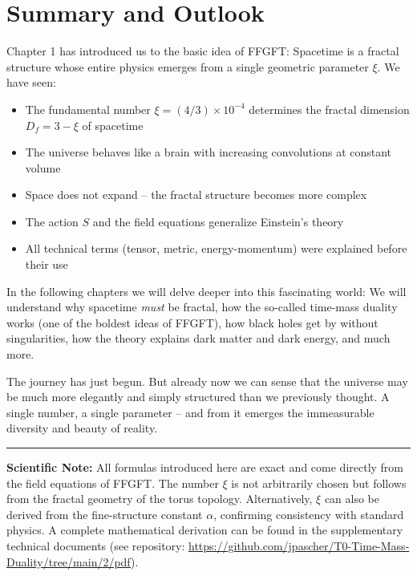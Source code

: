 \section{Summary and Outlook}

Chapter 1 has introduced us to the basic idea of FFGFT: Spacetime is a fractal structure whose entire physics emerges from a single geometric parameter $\xi$. We have seen:

\begin{itemize}[leftmargin=*]
\item The fundamental number $\xi = (4/3) \times 10^{-4}$ determines the fractal dimension $D_f = 3 - \xi$ of spacetime
\item The universe behaves like a brain with increasing convolutions at constant volume
\item Space does not expand -- the fractal structure becomes more complex
\item The action $S$ and the field equations generalize Einstein's theory
\item All technical terms (tensor, metric, energy-momentum) were explained before their use
\end{itemize}

In the following chapters we will delve deeper into this fascinating world: We will understand why spacetime \textit{must} be fractal, how the so-called time-mass duality works (one of the boldest ideas of FFGFT), how black holes get by without singularities, how the theory explains dark matter and dark energy, and much more.

The journey has just begun. But already now we can sense that the universe may be much more elegantly and simply structured than we previously thought. A single number, a single parameter -- and from it emerges the immeasurable diversity and beauty of reality.

\vspace{1cm}
\hrule
\vspace{0.5cm}
\noindent\textbf{Scientific Note:} All formulas introduced here are exact and come directly from the field equations of FFGFT. The number $\xi$ is not arbitrarily chosen but follows from the fractal geometry of the torus topology. Alternatively, $\xi$ can also be derived from the fine-structure constant $\alpha$, confirming consistency with standard physics. A complete mathematical derivation can be found in the supplementary technical documents (see repository: \url{https://github.com/jpascher/T0-Time-Mass-Duality/tree/main/2/pdf}).



